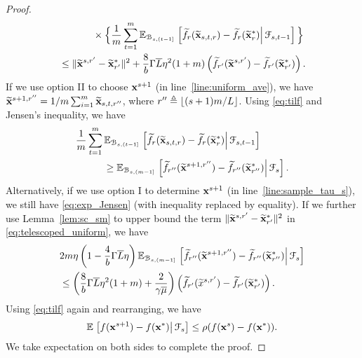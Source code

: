 \documentclass[10pt,twocolumn,journal]{IEEEtran}
\begin{document}
\begin{proof}
\begin{align}
& \hspace{1.2cm}\times\Big\{\frac{1}{m}\sum_{t=1}^m\mathbb{E}_{\mathcal{B}_{s,(t-1]}}\left.\left[\widetilde{f}_r (\widetilde{\mathbf{x}}_{s,t,r})-\widetilde{f}_r (\widetilde{\mathbf{x}}_r^*)\right\vert\mathcal{F}_{s,t-1}\right]\Big\}\nonumber\\
&\hspace{0cm}\le \Vert\widetilde{\mathbf{x}}^{s,r'}-\widetilde{\mathbf{x}}_{r'}^*\Vert^2+\frac{8}{b}\Gamma\overline{L}\eta^2(1+m)\left(\widetilde{f}_{r'}(\widetilde{\mathbf{x}}^{s,r'})-\widetilde{f}_{r'}(\widetilde{\mathbf{x}}_{r'}^*)\right).\label{eq:telescoped_uniform}
\end{align}
If we use option II to choose $\mathbf{x}^{s+1}$ (in line~\ref{line:uniform_ave}), we have $\widetilde{\mathbf{x}}^{s+1,r''}=1/m\sum_{i=1}^m \widetilde{\mathbf{x}}_{s,t,r''}$, where $r''\triangleq \lfloor{(s+1)m/L}\rfloor$. Using \eqref{eq:tilf} and Jensen's inequality, we have
\begin{align}
&\frac{1}{m}\sum_{t=1}^m\mathbb{E}_{\mathcal{B}_{s,(t-1]}}\left.\left[\widetilde{f}_r (\widetilde{\mathbf{x}}_{s,t,r})-\widetilde{f}_r (\widetilde{\mathbf{x}}_r^*)\right\vert\mathcal{F}_{s,t-1}\right] \nonumber\\
&\hspace{1cm}\ge \mathbb{E}_{\mathcal{B}_{s,(m-1]}}\left.\left[\widetilde{f}_{r''}(\widetilde{\mathbf{x}}^{s+1,r''})-\widetilde{f}_{r''}(\widetilde{\mathbf{x}}^*_{r''})\right\vert\mathcal{F}_{s}\right]. \label{eq:exp_Jensen}
\end{align}
Alternatively, if we use option I to determine $\mathbf{x}^{s+1}$ (in line~\ref{line:sample_tau_s}), we still have \eqref{eq:exp_Jensen} (with inequality replaced by equality). 
If we further use %
Lemma~\ref{lem:sc_sm} to upper bound the term $\Vert\widetilde{\mathbf{x}}^{s,r'}-\widetilde{\mathbf{x}}_{r'}^*\Vert^2$ in \eqref{eq:telescoped_uniform}, we have
\begin{align}
&2m\eta\left(1-\frac{4}{b}\Gamma\overline{L}\eta\right)\mathbb{E}_{\mathcal{B}_{s,(m-1]}}\left.\left[\widetilde{f}_{r''}(\widetilde{\mathbf{x}}^{s+1,r''})-\widetilde{f}_{r''}(\widetilde{\mathbf{x}}^*_{r''})\right\vert\mathcal{F}_{s}\right]\nonumber\\
&\hspace{0cm}\le \left(\frac{8}{b}\Gamma\overline{L}\eta^2(1+m)+\frac{2}{\gamma\overline{\mu}}\right)\left(\widetilde{f}_{r'}(\widetilde{x}^{s,r'})-\widetilde{f}_{r'}(\widetilde{\mathbf{x}}_{r'}^*)\right).
\end{align}
Using \eqref{eq:tilf} again and rearranging, we have %
\begin{equation}
\mathbb{E}\left.\left[f(\mathbf{x}^{s+1})-f(\mathbf{x}^*)\right\vert\mathcal{F}_s\right] \le \rho(f(\mathbf{x}^s)-f(\mathbf{x}^*)).
\end{equation}
We take expectation on both sides to complete the proof. 
\end{proof}
\end{document}
